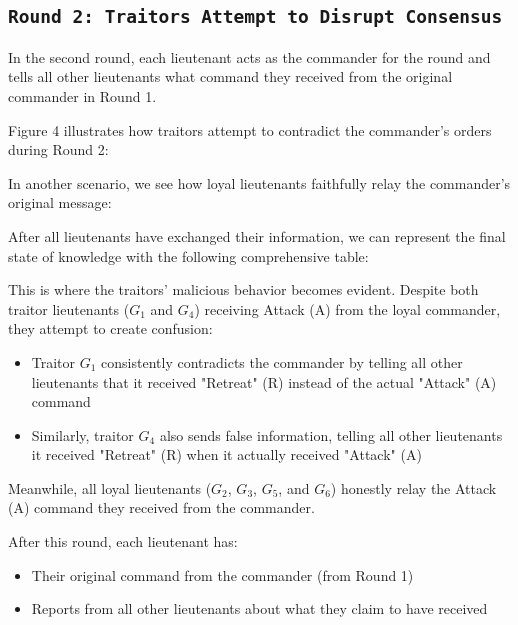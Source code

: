 \documentclass[11pt]{article}
\newcommand{\gen}[1]{\ensuremath{G_{#1}}}
\begin{document}
\subsection*{\texttt{\large Round 2: Traitors Attempt to Disrupt Consensus}}
In the second round, each lieutenant acts as the commander for the round and tells all other lieutenants what command they received from the original commander in Round 1.

Figure 4 illustrates how traitors attempt to contradict the commander's orders during Round 2:



In another scenario, we see how loyal lieutenants faithfully relay the commander's original message:



After all lieutenants have exchanged their information, we can represent the final state of knowledge with the following comprehensive table:



This is where the traitors' malicious behavior becomes evident. Despite both traitor lieutenants ($\gen{1}$ and $\gen{4}$) receiving Attack (A) from the loyal commander, they attempt to create confusion:

\begin{itemize}
    \item Traitor $\gen{1}$ consistently contradicts the commander by telling all other lieutenants that it received "Retreat" (R) instead of the actual "Attack" (A) command

    \item Similarly, traitor $\gen{4}$ also sends false information, telling all other lieutenants it received "Retreat" (R) when it actually received "Attack" (A)
\end{itemize}

Meanwhile, all loyal lieutenants ($\gen{2}$, $\gen{3}$, $\gen{5}$, and $\gen{6}$) honestly relay the Attack (A) command they received from the commander.

After this round, each lieutenant has:
\begin{itemize}
    \item Their original command from the commander (from Round 1)
    \item Reports from all other lieutenants about what they claim to have received
\end{itemize}
\end{document}
